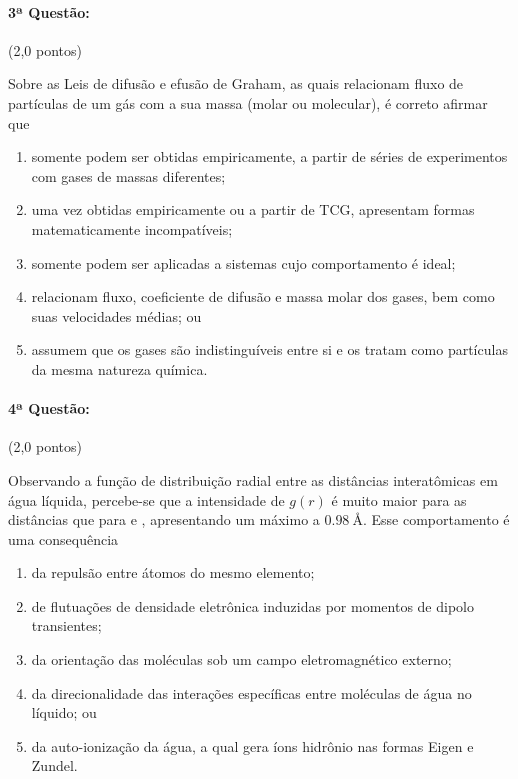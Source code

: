 \documentclass[12pt,a4paper]{article}
\begin{document}
\paragraph{3ª Questão:} (2,0 pontos)


Sobre as Leis de difusão e efusão de Graham, as quais relacionam 
fluxo de partículas de um gás com a sua massa (molar ou molecular), 
é correto afirmar que 
\begin{enumerate}[label = (\alph*)]
    \item somente podem ser obtidas empiricamente, a partir de séries de experimentos com gases de massas diferentes;
    \item uma vez obtidas empiricamente ou a partir de TCG, apresentam formas matematicamente incompatíveis;
    \item somente podem ser aplicadas a sistemas cujo comportamento é ideal; 
    \item relacionam fluxo, coeficiente de difusão e massa molar dos gases, bem como suas velocidades médias; ou
    \item assumem que os gases são indistinguíveis entre si e os tratam como partículas da mesma natureza química.    
\end{enumerate}

\newpage

\paragraph{4ª Questão:} (2,0 pontos)


Observando a função de distribuição radial entre as distâncias interatômicas em água líquida, percebe-se que a intensidade de $g(r)$ é muito maior para as 
distâncias  que para  e , apresentando um máximo a $\SI{0,98}{ \angstrom}$. Esse comportamento é uma consequência

\begin{enumerate}[label = (\alph*)]
    \item da repulsão entre átomos do mesmo elemento;
    \item de flutuações de densidade eletrônica induzidas por momentos de dipolo transientes;
    \item da orientação das moléculas sob um campo eletromagnético externo;
    \item da direcionalidade das interações específicas entre moléculas de água no líquido; ou
    \item da auto-ionização da água, a qual gera íons hidrônio nas formas Eigen e Zundel.
    
\end{enumerate}
\end{document}
